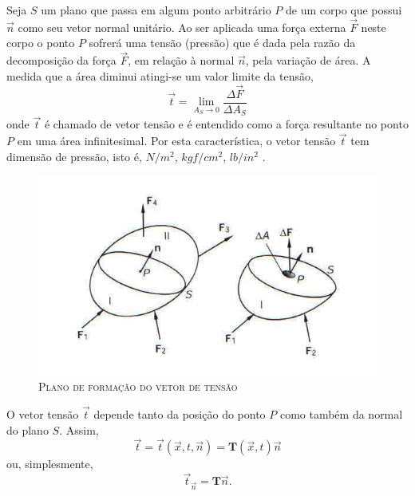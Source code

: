 Seja $ S $ um plano que passa em algum ponto arbitrário $ P $ de um corpo que possui $  \vec{n} $ como seu vetor normal unitário. Ao ser aplicada uma força externa  $ \vec{F}$ neste corpo o ponto $ P $ sofrerá uma tensão (pressão) que é dada pela razão da decomposição da força $ \vec{F} $, em relação à normal $ \vec{n} $, pela variação de área. A medida que a área diminui atingi-se um valor limite da tensão, 
\begin{equation}
	\vec{t} = \lim_{ A_{S} \to 0} \dfrac{ \Delta \vec{F}}{ \Delta A_{S}}
\end{equation}  
onde $ \vec{t} $ é chamado de vetor tensão e é entendido como a força resultante no ponto $ P $ em uma área infinitesimal. Por esta característica, o vetor tensão $ \vec{t} $ tem dimensão de pressão, isto é, $ N/m^{2} $, $ kgf/cm^{2} $, $ lb/in^{2} $ \cite{Lai}.

\begin{figure}[H]%
	\centering
	\includegraphics[scale=1]{figuras/vetor_tensao.jpg}
	\caption{\textsc{Plano de formação do vetor de tensão}}
	\vspace{-0.1cm}
	\label{fig:vetortensao}
\end{figure}

O vetor tensão $  \vec{t} $ depende tanto da posição do ponto $ P $ como também da normal do plano $ S $. Assim,
\begin{equation}
	\vec{t} = \vec{t} ( \vec{x}, t, \vec{n}) = \textbf{T} ( \vec{x}, t) \vec{n}
\end{equation} 
ou, simplesmente,
\begin{equation} \label{vetor_tensao}
	\vec{t} _{ \vec{n}} = \textbf{T} \vec{n}.
\end{equation}

